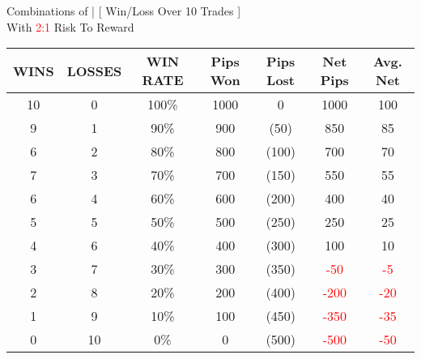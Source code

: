 \documentclass[10pt]{article}           %
\begin{document}
\begin{center}
\small{Combinations of | [ Win/Loss Over 10 Trades ]} \\
\small{With \textcolor{red}{2:1} Risk To Reward}
\vspace{0.4cm}

\renewcommand{\arraystretch}{1.5} %
\setlength{\tabcolsep}{10pt} %

\begin{tabular}{|c|c|c|c|c|c|c|}
  \hline
  WINS & LOSSES & WIN RATE & Pips Won & Pips Lost & Net Pips & Avg. Net \\ 
  \hline
  10 & 0 & 100\%  & 1000   & 0     & 1000 & 100 \\  
  \hline                                 
  9 & 1  & 90\%   & 900    & (50)  & 850  & 85 \\  
  \hline                           
  6 & 2  & 80\%   & 800    & (100) & 700  & 70 \\  
  \hline                          
  7 & 3  & 70\%   & 700    & (150) & 550  & 55 \\  
  \hline                         
  6 & 4  & 60\%   & 600    & (200) & 400  & 40 \\  
  \hline                     
  5 & 5  & 50\%   & 500    & (250) & 250  & 25 \\  
  \hline                
\rowcolor{yellow!60} 4 & 6  & 40\%   & 400    & (300) & 100  & 10 \\  
 \hline       
\rowcolor{yellow!60} 3 & 7  & 30\%   & 300    &(350)& \textcolor{red}{-50} & \textcolor{red}{-5} \\
\hline                      
  2 & 8  & 20\%   & 200    & (400) & \textcolor{red}{-200} & \textcolor{red}{-20} \\  
\hline                    
  1 & 9  & 10\%   & 100    & (450) & \textcolor{red}{-350} & \textcolor{red}{-35} \\  
\hline                     
  0 & 10 & 0\%    & 0      & (500) & \textcolor{red}{-500} & \textcolor{red}{-50} \\  
\hline
\end{tabular}
\end{center}
\vspace{0.1cm}


    

\end{document}
